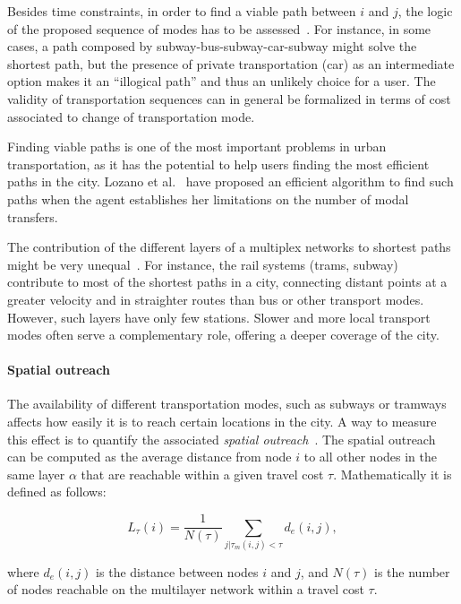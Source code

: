 Besides time constraints, in order to find a viable path between $i$ and $j$, the logic of the proposed sequence of modes has to be assessed~\cite{battista1996path,lozano2001path}. For instance, in some cases, a path composed by subway-bus-subway-car-subway might solve the shortest path, but the presence of private transportation (car) as an intermediate option makes it an ``illogical path'' and thus an unlikely choice for a user. The validity of transportation sequences can in general be formalized in terms of cost associated to change of transportation mode.

Finding viable paths is one of the most important problems in urban transportation, as it has the potential to help users finding the most efficient paths in the city. Lozano et al.~\cite{lozano2001path} have proposed an efficient algorithm to find such paths when the agent establishes her limitations on the number of modal transfers.

The contribution of the different layers of a multiplex networks to shortest paths might be very unequal~\cite{Aleta2017Multilayer}. For instance, the rail systems (trams, subway) contribute to most of the shortest paths in a city, connecting distant points at a greater velocity and in straighter routes than bus or other transport modes. However, such layers have only few stations. Slower and more local transport modes often serve a complementary role, offering a deeper coverage of the city.

\paragraph*{Spatial outreach}
The availability of different transportation modes, such as subways or tramways affects how easily it is to reach certain locations in the city. A way to measure this effect is to quantify the associated \textit{spatial outreach}~\cite{strano2015features}. The spatial outreach can be computed as the average distance from node $i$ to all other nodes in the same layer $\alpha$ that are reachable within a given travel cost $\tau$. Mathematically it is defined as follows:

\begin{equation}
    L_\tau(i)=\frac{1}{N(\tau)}\sum_{j|\tau_{m}(i,j)<\tau}d_e(i,j),
    \label{eq:outreach}
\end{equation}

where $d_e(i,j)$ is the distance between nodes $i$ and $j$, and $N(\tau)$ is the number of nodes reachable on the multilayer network within a travel cost $\tau$.

